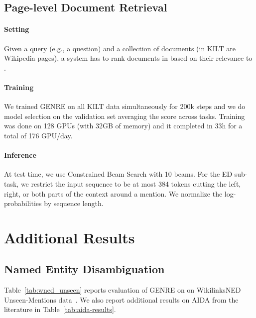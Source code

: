 \documentclass{article} \usepackage{main,times}
\makeatletter
\def\genre{\textsc{GENRE}\@\xspace}
\makeatother
\begin{document}
\subsection{Page-level Document Retrieval} \label{app:hyper_dr}

\paragraph{Setting}
Given a query  (e.g., a question) and a collection of documents  (in KILT are Wikipedia pages), a system has to rank documents in  based on their relevance to .

\paragraph{Training}
We trained \genre on all KILT data simultaneously for 200k steps and we do model selection on the validation set averaging the score across tasks.
Training was done on 128 GPUs (with 32GB of memory) and it completed in 33h for a total of 176 GPU/day.

\paragraph{Inference}
At test time, we use Constrained Beam Search with 10 beams. For the ED sub-task, we restrict the input sequence to be at most 384 tokens cutting the left, right, or both parts of the context around a mention. We normalize the log-probabilities by sequence length.

\section{Additional Results} \label{app:additional}


\subsection{Named Entity Disambiguation} \label{app:additional_ned}
Table~\ref{tab:wned_unseen} reports evaluation of \genre on on WikilinksNED Unseen-Mentions data~\citep{onoe2020fine}. We also report additional results on AIDA from the literature in Table~\ref{tab:aida-results}.
\end{document}
